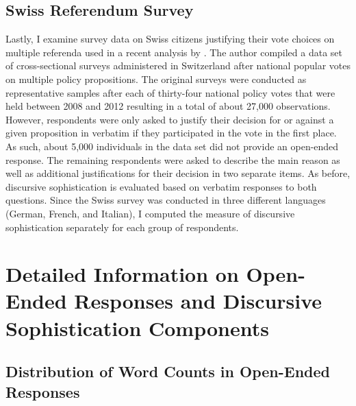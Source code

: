 \subsection{Swiss Referendum Survey}
Lastly, I examine survey data on Swiss citizens justifying their vote choices on multiple referenda used in a recent analysis by \citet{colombo2016justifications}. The author compiled a data set of cross-sectional surveys administered in Switzerland after national popular votes on multiple policy propositions. The original surveys were conducted as representative samples after each of thirty-four national policy votes that were held between 2008 and 2012 resulting in a total of about 27,000 observations. However, respondents were only asked to justify their decision for or against a given proposition in verbatim if they participated in the vote in the first place. As such, about 5,000 individuals in the data set did not provide an open-ended response. The remaining respondents were asked to describe the main reason as well as additional justifications for their decision in two separate items. As before, discursive sophistication is evaluated based on verbatim responses to both questions. Since the Swiss survey was conducted in three different languages (German, French, and Italian), I computed the measure of discursive sophistication separately for each group of respondents.


\section[Information on Discursive Sophistication Components]{Detailed Information on Open-Ended Responses and Discursive Sophistication Components}\label{app:oeinfo}


\subsection{Distribution of Word Counts in Open-Ended Responses}

